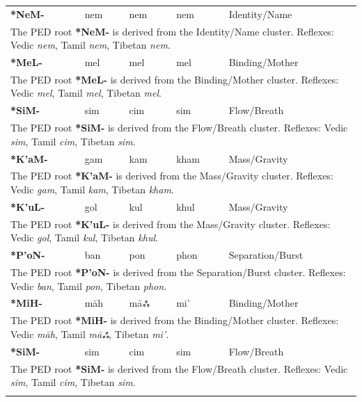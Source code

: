 \begin{longtable}{p{} p{} p{} p{} p{}}
\textbf{*NeM-} & nem & nem & nem & Identity/Name \\ 
\multicolumn{5}{p{\textwidth}}{\small The PED root \textbf{*NeM-} is derived from the Identity/Name cluster. Reflexes: Vedic \textit{nem}, Tamil \textit{nem}, Tibetan \textit{nem}. } \\ \addlinespace 
\textbf{*MeL-} & mel & mel & mel & Binding/Mother \\ 
\multicolumn{5}{p{\textwidth}}{\small The PED root \textbf{*MeL-} is derived from the Binding/Mother cluster. Reflexes: Vedic \textit{mel}, Tamil \textit{mel}, Tibetan \textit{mel}. } \\ \addlinespace 
\textbf{*SiM-} & sim & cim & sim & Flow/Breath \\ 
\multicolumn{5}{p{\textwidth}}{\small The PED root \textbf{*SiM-} is derived from the Flow/Breath cluster. Reflexes: Vedic \textit{sim}, Tamil \textit{cim}, Tibetan \textit{sim}. } \\ \addlinespace 
\textbf{*K'aM-} & gam & kam & kham & Mass/Gravity \\ 
\multicolumn{5}{p{\textwidth}}{\small The PED root \textbf{*K'aM-} is derived from the Mass/Gravity cluster. Reflexes: Vedic \textit{gam}, Tamil \textit{kam}, Tibetan \textit{kham}. } \\ \addlinespace 
\textbf{*K'uL-} & gol & kul & khul & Mass/Gravity \\ 
\multicolumn{5}{p{\textwidth}}{\small The PED root \textbf{*K'uL-} is derived from the Mass/Gravity cluster. Reflexes: Vedic \textit{gol}, Tamil \textit{kul}, Tibetan \textit{khul}. } \\ \addlinespace 
\textbf{*P'oN-} & ban & pon & phon & Separation/Burst \\ 
\multicolumn{5}{p{\textwidth}}{\small The PED root \textbf{*P'oN-} is derived from the Separation/Burst cluster. Reflexes: Vedic \textit{ban}, Tamil \textit{pon}, Tibetan \textit{phon}. } \\ \addlinespace 
\textbf{*MiH-} & māh & māஃ & mi' & Binding/Mother \\ 
\multicolumn{5}{p{\textwidth}}{\small The PED root \textbf{*MiH-} is derived from the Binding/Mother cluster. Reflexes: Vedic \textit{māh}, Tamil \textit{māஃ}, Tibetan \textit{mi'}. } \\ \addlinespace 
\textbf{*SiM-} & sim & cim & sim & Flow/Breath \\ 
\multicolumn{5}{p{\textwidth}}{\small The PED root \textbf{*SiM-} is derived from the Flow/Breath cluster. Reflexes: Vedic \textit{sim}, Tamil \textit{cim}, Tibetan \textit{sim}. } \\ \addlinespace 

\end{longtable}
